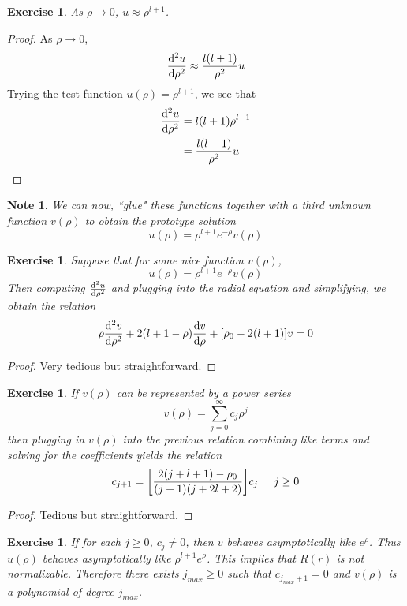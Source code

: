 \documentclass[12pt]{amsart}
\newtheorem{note}[thm]{Note}
\newtheorem{ex}[thm]{Exercise}
\begin{document}
\begin{ex}
As $\rho \rightarrow 0$, $u \approx \rho^{l+1}$.
\end{ex}

\begin{proof}
As $\rho \rightarrow 0$, $$\dv[2]{u}{\rho} \approx \frac{l(l+1)}{\rho^2}u$$ Trying the test function $u(\rho) = \rho^{l+1}$, we see that 
\begin{align*}
\dv[2]{u}{\rho}
&= l(l+1)\rho^{l-1} \\
&= \frac{l(l+1)}{\rho^2}u
\end{align*}
\end{proof}

\begin{note}
We can now, ``glue" these functions together with a third unknown function $v(\rho)$ to obtain the prototype solution $$u(\rho) = \rho^{l+1}e^{-\rho}v(\rho)$$
\end{note}

\begin{ex}
Suppose that for some nice function $v(\rho)$, $$u(\rho) = \rho^{l+1}e^{-\rho}v(\rho)$$ Then computing $\dv[2]{u}{\rho}$ and plugging into the radial equation and simplifying, we obtain the  relation $$\rho \dv[2]{v}{\rho} +2(l+1 - \rho)\dv{v}{\rho} + [\rho_0 - 2(l+1)]v = 0$$
\end{ex}

\begin{proof}
Very tedious but straightforward.
\end{proof}

\begin{ex}
If $v(\rho)$ can be represented by a power series $$v(\rho) = \sum_{j=0}^{\infty}c_j\rho^j$$ then plugging in $v(\rho)$ into the previous relation combining like terms and solving for the coefficients yields the relation $$c_{j+1} = \bigg[ \frac{2(j+l+1) - \rho_0}{(j+1)(j+2l+2)}\bigg]c_j \hspace{5mm} j \geq 0$$ \vspace{3mm} 
\end{ex}

\begin{proof}
Tedious but straightforward.
\end{proof}

\begin{ex}
If for each $j \geq 0$, $c_{j} \neq 0$, then $v$ behaves asymptotically like $e^{\rho}$. Thus $u(\rho)$ behaves asymptotically like $\rho^{l+1}e^{\rho}$. This implies that $R(r)$ is not normalizable. Therefore there exists $j_{max} \geq 0$ such that $c_{j_{max}+1} = 0$ and $v(\rho)$ is a polynomial of degree $j_{max}$.
\end{ex}
\end{document}
